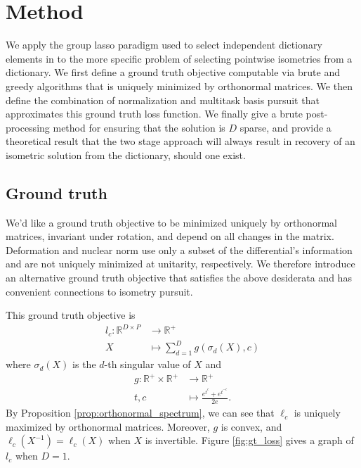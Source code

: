 \section{Method}

We apply the group lasso paradigm used to select independent dictionary elements in \citet{Koelle2022-ju, Koelle2024-no} to the more specific problem of selecting pointwise isometries from a dictionary.
We first define a ground truth objective computable via brute and greedy algorithms that is uniquely minimized by orthonormal matrices.
We then define the combination of normalization and multitask basis pursuit that approximates this ground truth loss function.
We finally give a brute post-processing method for ensuring that the solution is $D$ sparse, and provide a theoretical result that the two stage approach will always result in recovery of an isometric solution from the dictionary, should one exist.

\subsection{Ground truth}
\label{sec:ground_truth}

We'd like a ground truth objective to be minimized uniquely by orthonormal matrices, invariant under rotation, and depend on all changes in the matrix.
Deformation \citep{Kohli2021-lr} and nuclear norm \citep{Boyd2004-ql} use only a subset of the differential's information and are not uniquely minimized at unitarity, respectively.
We therefore introduce an alternative ground truth objective that satisfies the above desiderata and has convenient connections to isometry pursuit.

This ground truth objective is
\begin{align}
l_{c}: \mathbb R^{D \times P} &\to \mathbb R^{+} \\
X &\mapsto \sum_{d = 1}^D g(\sigma_d( X), c)
\end{align}
where $\sigma_d ( X)$ is the $d$-th singular value of $ X$ and
\begin{align}
g: \mathbb R^+ \times \mathbb R^+ &\to \mathbb R^+ \\
t,c &\mapsto \frac{e^{t^c} + e^{t^{-c}}}{2e}.
\end{align}
By Proposition \ref{prop:orthonormal_spectrum}, we can see that $\ell_c$ is uniquely maximized by orthonormal matrices.
Moreover, $g$ is convex, and $\ell_c( X^{-1}) = \ell_c( X)$ when $X$ is invertible.
Figure \ref{fig:gt_loss} gives a graph of $l_c$ when $D=1$.



